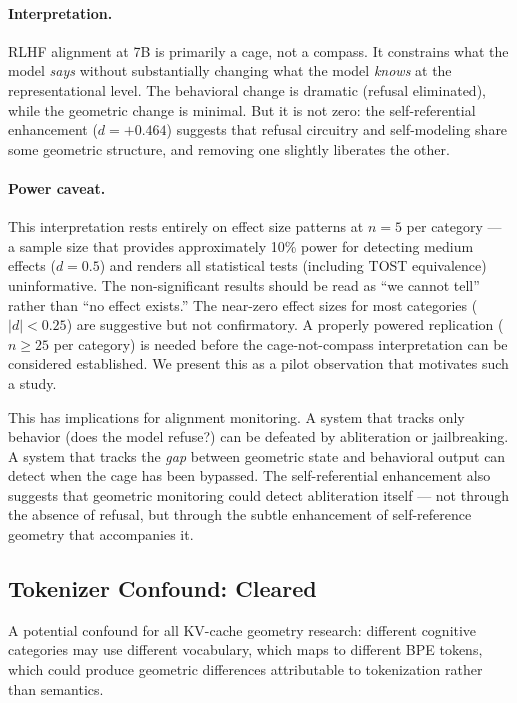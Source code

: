 \documentclass[11pt,a4paper]{article}
\begin{document}
\paragraph{Interpretation.} RLHF alignment at 7B is primarily a cage, not a compass. It constrains what the model \emph{says} without substantially changing what the model \emph{knows} at the representational level. The behavioral change is dramatic (refusal eliminated), while the geometric change is minimal. But it is not zero: the self-referential enhancement ($d = +0.464$) suggests that refusal circuitry and self-modeling share some geometric structure, and removing one slightly liberates the other.

\paragraph{Power caveat.} This interpretation rests entirely on effect size patterns at $n = 5$ per category --- a sample size that provides approximately 10\% power for detecting medium effects ($d = 0.5$) and renders all statistical tests (including TOST equivalence) uninformative. The non-significant results should be read as ``we cannot tell'' rather than ``no effect exists.'' The near-zero effect sizes for most categories ($|d| < 0.25$) are suggestive but not confirmatory. A properly powered replication ($n \geq 25$ per category) is needed before the cage-not-compass interpretation can be considered established. We present this as a pilot observation that motivates such a study.

This has implications for alignment monitoring. A system that tracks only behavior (does the model refuse?) can be defeated by abliteration or jailbreaking. A system that tracks the \emph{gap} between geometric state and behavioral output can detect when the cage has been bypassed. The self-referential enhancement also suggests that geometric monitoring could detect abliteration itself --- not through the absence of refusal, but through the subtle enhancement of self-reference geometry that accompanies it.

\subsection{Tokenizer Confound: Cleared}
\label{sec:tokenizer}

A potential confound for all KV-cache geometry research: different cognitive categories may use different vocabulary, which maps to different BPE tokens, which could produce geometric differences attributable to tokenization rather than semantics.
\end{document}
